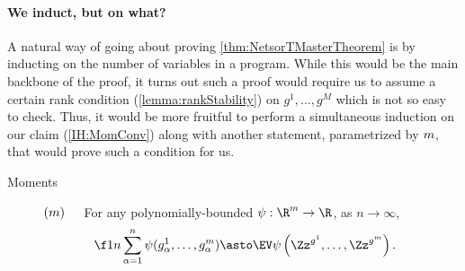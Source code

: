 \documentclass[main.tex]{subfiles}
\begin{document}
\paragraph{We induct, but on what?}
A natural way of going about proving \cref{thm:NetsorTMasterTheorem} is by inducting on the number of variables in a program.
While this would be the main backbone of the proof, it turns out such a proof would require us to assume a certain rank condition (\cref{lemma:rankStability}) on $g^1, \ldots, g^M$ which is not so easy to check.
Thus, it would be more fruitful to perform a simultaneous induction on our claim (\ref{IH:MomConv}) along with another statement, parametrized by $m$, that would prove such a condition for us.
\begin{description}
\item[Moments\label{IH:MomConv}]\!\!\!$(m)$\ \ \ 
    For any polynomially-bounded $\psi: \R^\MM \to \R$, as $n \to \infty$,
\begin{align*}
    \f 1 n \sum_{\alpha=1}^n \psi(g^1_\alpha, \ldots, g^\MM_\alpha) &\asto 
    \EV
      \psi\left(
      \Zz^{g^1}, \ldots, \Zz^{g^\MM} \right)
      .
\end{align*}


\end{description}
\end{document}
